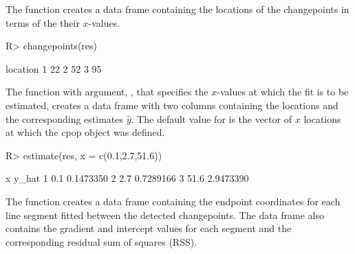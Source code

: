 \documentclass[nojss]{jss}
\begin{document}
The function 
creates a data frame containing the locations of the changepoints in terms of the their $x$-values.
\begin{CodeChunk}
\begin{CodeInput}
R> changepoints(res)
\end{CodeInput}
\begin{CodeOutput}
  location
1       22
2       52
3       95
\end{CodeOutput}
\end{CodeChunk}
%
%
%
%
The function  with argument,
 , that specifies the $x$-values at which the fit is to be estimated, creates a data frame with two columns containing the locations  and the corresponding estimates $\hat{y}$. The default value for  is the vector of $x$ locations at which the cpop object was defined.
\begin{CodeChunk}
\begin{CodeInput}
R> estimate(res, x = c(0.1,2.7,51.6))
\end{CodeInput}
\begin{CodeOutput}
   x     y_hat
1  0.1 0.1473350
2  2.7 0.7289166
3 51.6 2.9473390
\end{CodeOutput}
\end{CodeChunk}
%
%
The function  creates a data frame containing the endpoint coordinates for each line segment fitted between the detected
changepoints. The data frame also contains the gradient and intercept values for each segment and the corresponding residual sum of squares (RSS).
\end{document}
